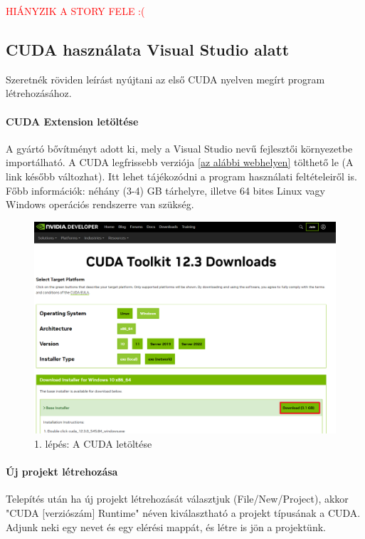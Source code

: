 \textcolor{red}{HIÁNYZIK A STORY FELE :( }

\subsection{CUDA használata Visual Studio alatt}

Szeretnék röviden leírást nyújtani az első CUDA nyelven megírt program létrehozásához.

\paragraph{CUDA Extension letöltése}
A gyártó bővítményt adott ki, mely a Visual Studio nevű fejlesztői környezetbe importálható. A CUDA legfrissebb verziója \href{https://developer.nvidia.com/cuda-downloads}{[az alábbi webhelyen]} tölthető le (A link később változhat). Itt lehet tájékozódni a program használati feltételeiről is. Főbb információk: néhány (3-4) GB tárhelyre, illetve 64 bites Linux vagy Windows operációs rendszerre van szükség.

\begin{figure}[ht!]
	\centering
	\includegraphics[width=150mm, keepaspectratio] {figures/install-1.png}
	\caption{1. lépés: A CUDA letöltése}
\end{figure}

\paragraph{Új projekt létrehozása}
Telepítés után ha új projekt létrehozását választjuk (File/New/Project), akkor "CUDA [verziószám] Runtime" néven kiválasztható a projekt típusának a CUDA. Adjunk neki egy nevet és egy elérési mappát, és létre is jön a projektünk.

